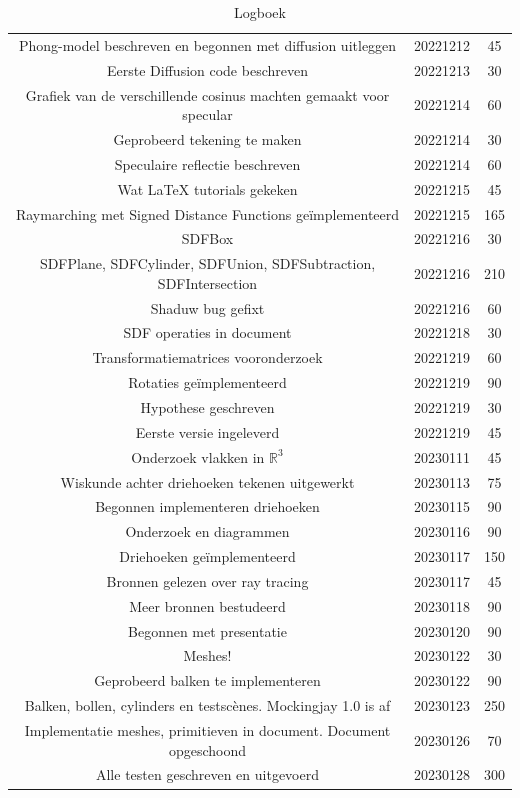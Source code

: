 \documentclass[12pt, a4paper]{article}
\begin{document}
\begin{table}[!htp]
\begin{tabular}{| c c c |}
		Phong-model beschreven en begonnen met diffusion uitleggen &20221212 &45 \\
		Eerste Diffusion code beschreven &20221213 &30 \\
		Grafiek van de verschillende cosinus machten gemaakt voor specular &20221214 &60 \\
		Geprobeerd tekening te maken &20221214 &30 \\
		Speculaire reflectie beschreven &20221214 &60 \\
		Wat LaTeX tutorials gekeken &20221215 &45 \\
		Raymarching met Signed Distance Functions geïmplementeerd &20221215 &165 \\
		SDFBox &20221216 &30 \\
		SDFPlane, SDFCylinder, SDFUnion, SDFSubtraction, SDFIntersection &20221216 &210 \\
		Shaduw bug gefixt &20221216 &60 \\
		SDF operaties in document &20221218 &30 \\
		Transformatiematrices vooronderzoek &20221219 &60 \\
		Rotaties geïmplementeerd &20221219 &90 \\
		Hypothese geschreven &20221219 &30 \\
		Eerste versie ingeleverd &20221219 &45 \\
		Onderzoek vlakken in $\mathbb{R}^3$ &20230111 &45 \\
		Wiskunde achter driehoeken tekenen uitgewerkt &20230113 &75 \\
		Begonnen implementeren driehoeken &20230115 &90 \\
		Onderzoek en diagrammen &20230116 &90 \\
		Driehoeken geïmplementeerd &20230117 &150 \\
		Bronnen gelezen over ray tracing &20230117 &45 \\
		Meer bronnen bestudeerd &20230118 &90 \\
		Begonnen met presentatie &20230120 &90 \\
		Meshes! &20230122 &30 \\
		Geprobeerd balken te implementeren &20230122 &90 \\
		Balken, bollen, cylinders en testscènes. Mockingjay 1.0 is af &20230123 &250 \\
		Implementatie meshes, primitieven in document. Document opgeschoond &20230126 &70 \\
		Alle testen geschreven en uitgevoerd &20230128 &300 \\
		\hline
	\end{tabular}
	\caption{Logboek}
\end{table}
\end{document}

